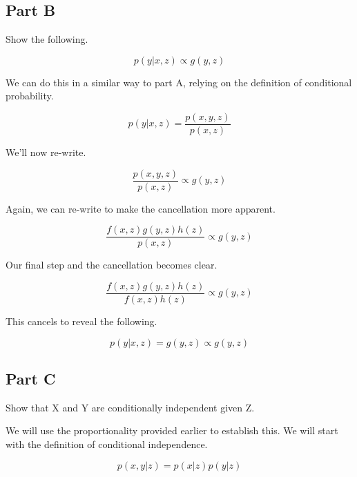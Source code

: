 \documentclass[12pt, letterpaper]{article}
\begin{document}
\subsection{Part B} 

Show the following. 

\begin{equation}
p(y | x, z) \propto g(y, z) 
\end{equation} 

We can do this in a similar way to part A, relying on the definition of conditional probability. 

\begin{equation} 
p(y | x, z) = \frac{p(x, y, z)}{p(x, z)} 
\end{equation} 

We'll now re-write. 

\begin{equation} 
\frac{p(x, y, z)}{p(x, z)} \propto g(y, z) 
\end{equation} 

Again, we can re-write to make the cancellation more apparent. 

\begin{equation} 
\frac{f(x, z) g(y, z) h(z)}{p(x, z)} \propto g(y, z)
\end{equation} 

Our final step and the cancellation becomes clear. 

\begin{equation} 
\frac{f(x, z) g(y, z) h(z)}{f(x, z) h(z)} \propto g(y, z) 
\end{equation} 

This cancels to reveal the following. 

\begin{equation} 
p(y | x, z) = g(y, z) \propto g(y, z) 
\end{equation} 

\subsection{Part C} 

Show that X and Y are conditionally independent given Z. 

We will use the proportionality provided earlier to establish this. We will start with the definition of conditional independence. 

\begin{equation} 
p(x, y | z) = p(x | z) p(y | z) 
\end{equation} 
\end{document}

